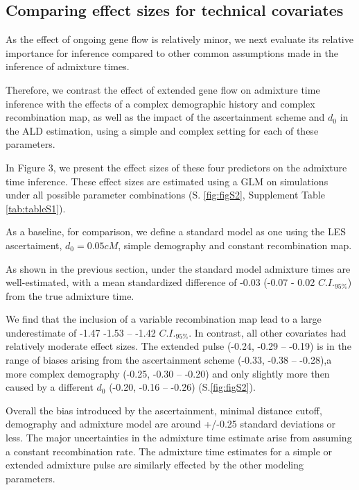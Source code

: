 \documentclass[]{article}
\begin{document}
\subsection{Comparing effect sizes for technical covariates}\label{comparing effect sizes}

As the effect of ongoing gene flow is relatively minor, we next evaluate its relative importance for inference compared to other common assumptions made in the inference of admixture times. 

Therefore, we contrast the effect of extended gene flow on admixture time inference with  the effects of a complex demographic history and complex recombination map, as well as the impact of the ascertainment scheme and $d_0$ in the ALD estimation, using a simple and complex setting for each of these parameters. 

In Figure 3, we present the effect sizes of these four predictors on the admixture time inference. These effect sizes are estimated using a GLM on simulations under all possible parameter combinations  (S. \ref{fig:figS2}, Supplement Table \ref{tab:tableS1}).

As a baseline, for comparison, we define a standard model as one using the LES ascertaiment, \(d_{0} = 0.05 cM\), simple demography and constant recombination map. 

As shown in the previous section, under the standard model admixture times are well-estimated, with a mean standardized difference of  -0.03 (-0.07 - 0.02 $C.I._{95\%}$) from the true
admixture time.

We find that the  inclusion of a variable recombination map lead to a large underestimate of -1.47 -1.53 -- -1.42 $C.I._{95\%}$. In contrast, all other covariates had relatively moderate effect sizes. The extended pulse   (-0.24,  -0.29 -- -0.19) is in the range of biases arising from the ascertainment scheme (-0.33, -0.38 --
-0.28),a more complex demography (-0.25, -0.30 -- -0.20) and only slightly more then caused by a different $d_0$ (-0.20, -0.16 --
-0.26) (S.\ref{fig:figS2}).

Overall the bias introduced by the ascertainment, minimal distance
cutoff, demography and admixture model are  around +/-0.25 standard deviations or less. The major uncertainties in the admixture time
estimate arise from assuming a constant recombination rate. The
admixture time estimates for a simple or extended admixture pulse are similarly effected by the other modeling parameters.
\end{document}
